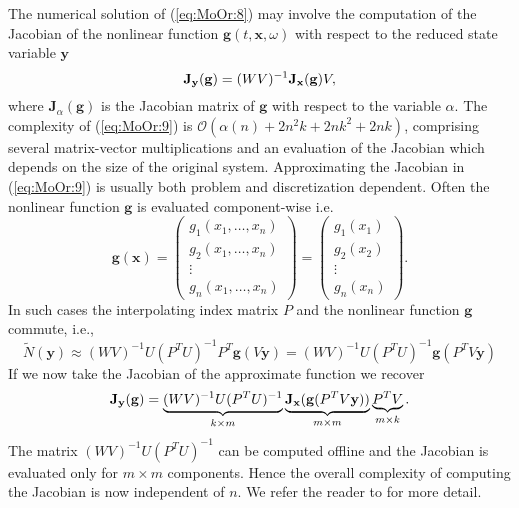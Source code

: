 {\edit The numerical solution of (\ref{eq:MoOr:8}) may involve the computation of the Jacobian of the nonlinear function $\mathbf g(t,\mathbf x, \omega)$ with respect to the reduced state variable $\mathbf y$}
\begin{equation} \label{eq:MoOr:9}
	\edit \mathbf J_{\mathbf y}(\mathbf g) = (WV)^{-1} \mathbf J_{\mathbf x}(\mathbf g) V,
\end{equation}
{\edit where $\mathbf J_\alpha(\mathbf g)$ is the Jacobian matrix of $\mathbf g$ with respect to the variable $\alpha$.} The complexity of (\ref{eq:MoOr:9}) is $\mathcal{O}(\alpha(n) +2n^2k+2nk^2+2nk)$, comprising several matrix-vector multiplications and an evaluation of the Jacobian which depends on the size of the original system. Approximating the Jacobian in (\ref{eq:MoOr:9}) is usually both problem and discretization dependent. Often the nonlinear function $\mathbf g$ is evaluated component-wise i.e.
\begin{equation} \label{eq:MoOr:15}
	\mathbf g(\mathbf x) =
	\begin{pmatrix}
		g_1(x_1,\dots,x_n) \\
		g_2(x_1,\dots,x_n) \\
		\vdots \\
		g_n(x_1,\dots,x_n)
	\end{pmatrix}
	=
	\begin{pmatrix}
		g_1(x_1) \\
		g_2(x_2) \\
		\vdots \\
		g_n(x_n)
	\end{pmatrix}.
\end{equation}
In such cases the interpolating index matrix $P$ and the nonlinear function $\mathbf g$ commute, i.e.,
\begin{equation} \label{eq:MoOr:16}
	\tilde N(\mathbf y) \approx (WV)^{-1} U(P^TU)^{-1}P^T \mathbf g(V\mathbf y) = (WV)^{-1} U(P^TU)^{-1}\mathbf g(P^TV\mathbf y)
\end{equation}
If we now take the Jacobian of the approximate function we recover
\begin{equation}
	\color{black} \mathbf J_{\mathbf y}(\mathbf g) = \underbrace{ (WV)^{-1} U(P^TU)^{-1} }_{k\times m} \underbrace{ \mathbf J_{\mathbf x}(\mathbf g(P^T V \mathbf y) ) }_{m\times m} \underbrace{P^T V}_{m\times k}.
\end{equation}
The matrix $(WV)^{-1} U(P^TU)^{-1}$ can be computed offline and the Jacobian is evaluated only for $m\times m$ components. Hence the overall complexity of computing the Jacobian is now independent of $n$. {\edit We refer the reader to \cite{Barrault:2004kz,Chaturantabut:2010cz} for more detail.}
